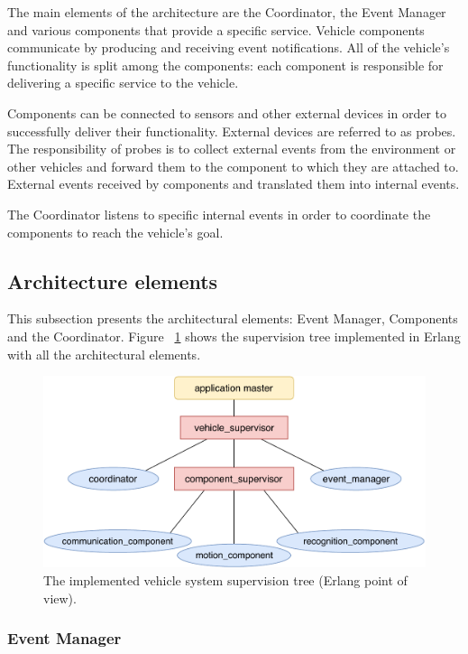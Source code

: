 \documentclass{memoir}
\begin{document}
The main elements of the architecture are the Coordinator, the Event Manager and various components that provide a specific service.
Vehicle components communicate by producing and receiving event notifications. All of the vehicle's functionality is split among the components: each component is responsible for delivering a specific service to the vehicle.

Components can be connected to sensors and other external devices in order to successfully deliver their functionality. External devices are referred to as probes.
The responsibility of probes is to collect external events from the environment or other vehicles and forward them to the component to which they are attached to.
External events received by components and translated them into internal events.


The Coordinator listens to specific internal events in order to coordinate the components to reach the vehicle's goal.

\subsection{Architecture elements}

This subsection presents the architectural elements: Event Manager, Components and the Coordinator. Figure ~\ref{fig:erlang-point-of-view} shows the supervision tree implemented in Erlang with all the architectural elements.

\begin{figure}
	\centering
	\includegraphics[width=0.8\linewidth]{implementation_details/erlang_point-of-view.pdf}
	\caption{The implemented vehicle system supervision tree (Erlang point of view).}
	\label{fig:erlang-point-of-view}
\end{figure}

\subsubsection{Event Manager}
\end{document}

